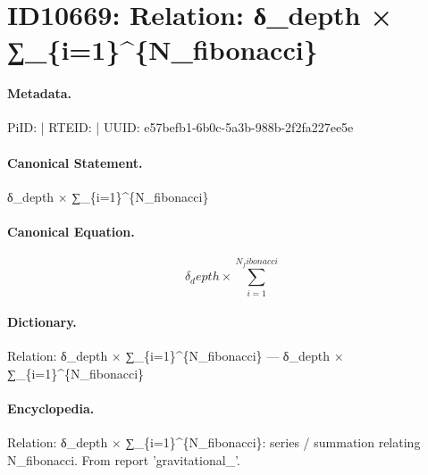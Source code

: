 \section*{ID10669: Relation: δ\_depth × ∑\_\{i=1\}\textasciicircum{}\{N\_fibonacci\}}
\paragraph{Metadata.}
PiID:  | RTEID:  | UUID: e57befb1-6b0c-5a3b-988b-2f2fa227ee5e

\paragraph{Canonical Statement.}
δ\_depth × ∑\_\{i=1\}\textasciicircum{}\{N\_fibonacci\}

\paragraph{Canonical Equation.}
\[
δ_depth × ∑_{i=1}^{N_fibonacci}
\]

\paragraph{Dictionary.}
Relation: δ\_depth × ∑\_\{i=1\}\textasciicircum{}\{N\_fibonacci\} — δ\_depth × ∑\_\{i=1\}\textasciicircum{}\{N\_fibonacci\}

\paragraph{Encyclopedia.}
Relation: δ\_depth × ∑\_\{i=1\}\textasciicircum{}\{N\_fibonacci\}: series / summation relating N\_fibonacci. From report 'gravitational\_'.

